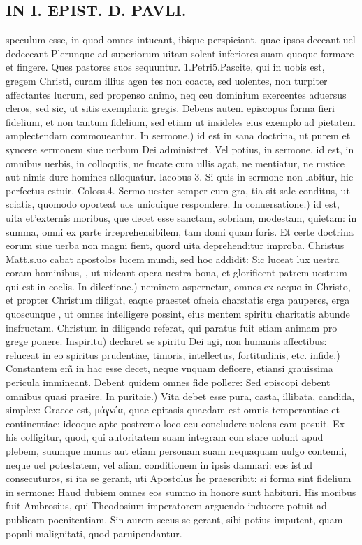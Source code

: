 \documentclass{article}
\begin{document}
\begin{pages}
\section*{IN I. EPIST. D. PAVLI. }
\marginpar{[ p.100 ]}\pstart speculum esse, in quod omnes intueant, ibique perspiciant, quae ipsos deceant uel dedeceant Plerunque ad superiorum uitam solent inferiores suam quoque formare et fingere. Ques pastores suos sequuntur. 1.Petri5.Pascite, qui in uobis est, gregem Christi, curam illius agen tes non coacte, sed uolentes, non turpiter affectantes lucrum, sed propenso animo, neq ceu dominium exercentes aduersus cleros, sed sic, ut sitis exemplaria gregis. Debens autem episcopus forma fieri fidelium, et non tantum fidelium, sed etiam ut insideles eius exemplo ad pietatem amplectendam commoueantur.  \pend\pstart In sermone.) id est in sana doctrina, ut purem et syncere sermonem siue uerbum Dei administret. Vel potius, in sermone, id est, in omnibus uerbis, in colloquiis, ne fucate cum ullis agat, ne mentiatur, ne rustice aut nimis dure homines alloquatur. lacobus 3. Si quis in sermone non labitur, hic perfectus estuir. Coloss.4. Sermo uester semper cum gra, tia sit sale conditus, ut sciatis, quomodo oporteat uos unicuique respondere.  \pend\pstart In conuersatione.) id est, uita et’externis moribus, que decet esse sanctam, sobriam, modestam, quietam: in summa, omni ex parte irreprehensibilem, tam domi quam foris. Et certe doctrina eorum siue uerba non magni fient, quord uita deprehenditur improba. Christus Matt.s.uo cabat apostolos lucem mundi, sed hoc addidit: Sic luceat lux uestra coram hominibus,  , ut uideant opera uestra bona, et glorificent patrem uestrum qui est in coelis.  \pend\pstart In dilectione.) neminem aspernetur, omnes ex aequo in Christo, et propter Christum diligat, eaque praestet ofneia charstatis erga pauperes, erga quoscunque , ut omnes intelligere possint, eius mentem spiritu charitatis abunde insfructam. Christum in diligendo referat, qui paratus fuit etiam animam pro grege ponere.  \pend\pstart Inspiritu) declaret se spiritu Dei agi, non humanis affectibus: reluceat in eo spiritus prudentiae, timoris, intellectus, fortitudinis, etc.  \pend\pstart infide.) Constantem em̃ in hac esse decet, neque vnquam deficere, etiansi grauissima pericula immineant. Debent quidem omnes fide pollere: Sed episcopi debent omnibus quasi praeire. In puritaie.) Vita debet esse pura, casta, illibata, candida, simplex: Graece est, μάγνέα, quae epitasis quaedam est omnis temperantiae et continentiae: ideoque apte postremo loco ceu concludere uolens eam posuit. Ex his colligitur, quod, qui autoritatem suam integram con stare uolunt apud plebem, suumque munus aut etiam personam suam nequaquam uulgo contenni, neque uel potestatem, vel aliam conditionem in ipsis damnari: eos istud consecuturos, si ita se gerant, uti Apostolus ĥe praescribit: si forma sint fidelium in sermone: Haud dubiem omnes eos summo in honore sunt habituri. His moribus fuit Ambrosius, qui Theodosium imperatorem arguendo inducere potuit ad publicam poenitentiam. Sin aurem secus se gerant, sibi potius imputent, quam populi malignitati, quod paruipendantur.  \pend
{}
{}

\end{pages}
\end{document}
